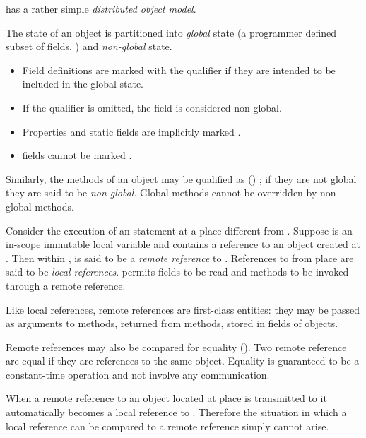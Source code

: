 \Xten{} has a rather simple \emph{distributed object model}. 

The state of an object is partitioned into \emph{global} state (a
programmer defined subset of  fields, ) and
\emph{non-global} state.

 \begin{itemize}
\item Field definitions are marked with the qualifier  if
  they are intended to be included in the global state.
\item If the  qualifier is omitted, the field is
  considered non-global.
\item Properties and static fields are implicitly marked .
\item {} fields cannot be marked .
\end{itemize}
 
Similarly, the methods of an object may be qualified as
() ; if they are not global they are
said to be \emph{non-global}. 
Global methods cannot be overridden by non-global methods.

Consider the execution of an  statement at a place
 different from . Suppose  is an in-scope
immutable local variable and contains a reference to an object 
created at . Then within ,  is said to be a
\emph{remote reference} to . References to  from place
 are said to be \emph{local references}. \Xten{} permits
 fields to be read and  methods to be invoked
through a remote reference.

Like local references, remote references are first-class entities:
they may be passed as arguments to methods, returned from methods,
stored in fields of objects.

Remote references may also be compared for equality (\Xcd{==}). Two
remote reference are equal if they are references to the same
object. Equality is guaranteed to be a constant-time operation and not
involve any communication.

When a remote reference to an object  located at place  is
transmitted to  it automatically becomes a local reference to
. Therefore the situation in which a local reference can be compared
to a remote reference simply cannot arise.

